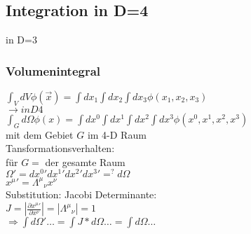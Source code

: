 \documentclass[a4paper]{article}
\begin{document}
\subsection{Integration in D=4}
in D=3 
\subsubsection{Volumenintegral} $\int_V dV \phi(\vec{x})=\int dx_1 \int dx_2
  \int dx_3 \phi(x_1,x_2,x_3)$ \\
  $\rightarrow in D4 $\\ $\int_G d\Omega \phi(x)=\int dx^0\int dx^1 \int dx^2
  \int dx^3 \phi(x^0,x^1,x^2,x^3)$\\ mit dem Gebiet $G$ im 4-D Raum\\
  Tansformationsverhalten: \\ für $G=$ der gesamte Raum
  \\$\Omega'=dx^0{}'dx^1{}'dx^2{}'dx^3{}'=^?d\Omega$\\$x^\mu{}'=\Lambda^\mu{}_\nu
  x^\nu$\\ 
  Substitution: Jacobi Determinante:\\ $J=\left|\frac{\partial
  x^\mu{}'}{\partial x^\nu}\right|=\left|\Lambda^\mu{}_\nu\right|=1$ \\ 
  $\Rightarrow \int d\Omega'\ldots=\int J*d\Omega\ldots=\int d\Omega\ldots$
\end{document}
